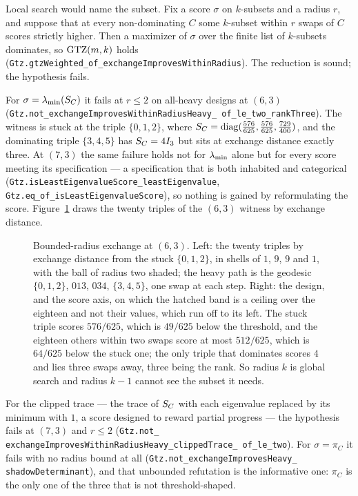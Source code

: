 Local search would name the subset.  Fix a score $\sigma$ on $k$-subsets and
a radius $r$, and suppose that at every non-dominating $C$ some $k$-subset
within $r$ swaps of $C$ scores strictly higher.  Then a maximizer of
$\sigma$ over the finite list of $k$-subsets dominates, so $\mathrm{GTZ}(m,k)$
holds (\texttt{Gtz.gtz\allowbreak Weighted\_of\_exchange\allowbreak Improves\allowbreak Within\allowbreak Radius}).  The
reduction is sound; the hypothesis fails.

For $\sigma=\lambda_{\min}(S_{C})$ it fails at $r\le2$ on all-heavy designs at $(6,3)$
(\texttt{Gtz.not\_\allowbreak exchange\allowbreak Improves\allowbreak Within\allowbreak Radius\allowbreak Heavy\_\allowbreak
of\_\allowbreak le\_\allowbreak two\_\allowbreak rank\allowbreak Three}).  The witness
is stuck at the triple $\{0,1,2\}$, where
$S_{C}=\operatorname{diag}(\tfrac{576}{625},\tfrac{576}{625},\tfrac{729}{400})$, and the
dominating triple $\{3,4,5\}$ has $S_{C}=4I_3$ but sits at exchange distance
exactly three.  At $(7,3)$ the same failure holds not for $\lambda_{\min}$ alone but
for every score meeting its specification --- a specification that is both
inhabited and categorical
(\texttt{Gtz.is\allowbreak Least\allowbreak Eigenvalue\allowbreak Score\_\allowbreak least\allowbreak Eigenvalue},
\texttt{Gtz.eq\_of\_\allowbreak is\allowbreak Least\allowbreak Eigenvalue\allowbreak Score}), so nothing is
gained by reformulating the score.  Figure~\ref{fig:exchange} draws the twenty
triples of the $(6,3)$ witness by exchange distance.

\begin{figure}[ht]
  \centering
  
  \caption{Bounded-radius exchange at $(6,3)$.  Left: the twenty triples by
  exchange distance from the stuck $\{0,1,2\}$, in shells of $1$, $9$, $9$ and
  $1$, with the ball of radius two shaded; the heavy path is the geodesic
  $\{0,1,2\}$, $013$, $034$, $\{3,4,5\}$, one swap at each step.  Right: the
  design, and the score axis, on which the hatched band is a ceiling over the
  eighteen and not their values, which run off to its left.  The stuck triple
  scores $576/625$, which is $49/625$ below the threshold, and the eighteen
  others within two swaps score at most $512/625$, which is $64/625$ below the
  stuck one; the only triple that dominates scores $4$ and lies three swaps away,
  three being the rank.  So radius $k$ is global search and radius $k-1$ cannot
  see the subset it needs.}
  \label{fig:exchange}
\end{figure}

For the clipped trace --- the trace of $S_{C}$ with each eigenvalue replaced
by its minimum with $1$, a score designed to reward partial progress --- the
hypothesis fails at $(7,3)$ and $r\le2$
(\texttt{Gtz.not\_\allowbreak
exchange\allowbreak Improves\allowbreak Within\allowbreak Radius\allowbreak Heavy\_\allowbreak clipped\allowbreak Trace\_\allowbreak
of\_\allowbreak le\_\allowbreak two}).  For $\sigma=\pi_C$ it fails with no
radius bound at all
(\texttt{Gtz.not\_\allowbreak exchange\allowbreak Improves\allowbreak Heavy\_\allowbreak
shadow\allowbreak Determinant}), and that unbounded refutation is the informative one:
$\pi_C$ is the only one of the three that is not threshold-shaped.

